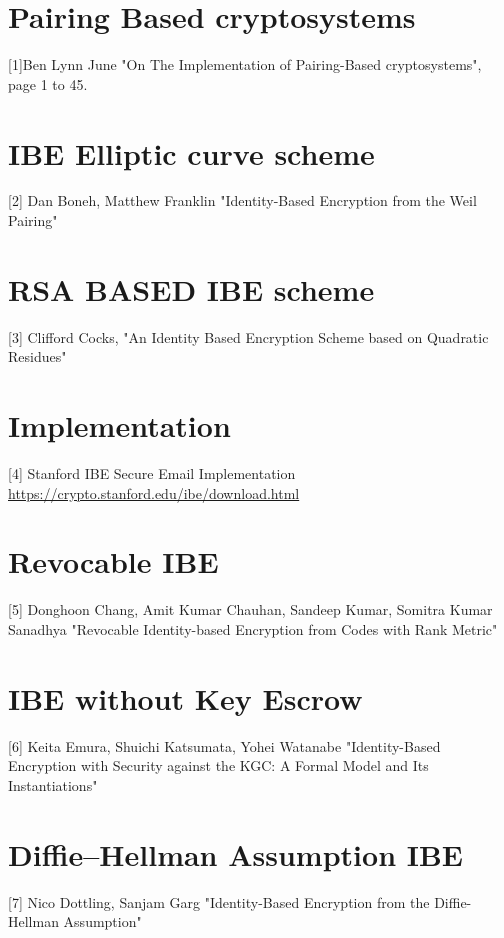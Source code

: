 \documentclass[conference]{IEEEtran}
\begin{document}
\appendix
\section{Pairing Based cryptosystems}
[1]Ben Lynn June "On The Implementation of Pairing-Based cryptosystems", 
page 1 to 45.

\section{IBE Elliptic curve scheme}
[2] Dan Boneh, Matthew Franklin "Identity-Based Encryption from the Weil Pairing"

\section{RSA BASED IBE scheme}
[3] Clifford Cocks, "An Identity Based Encryption Scheme based on Quadratic Residues"

\section{Implementation}
[4] Stanford IBE Secure Email Implementation \url{https://crypto.stanford.edu/ibe/download.html}

\section{Revocable IBE}
[5] Donghoon Chang, Amit Kumar Chauhan, Sandeep Kumar, Somitra Kumar Sanadhya "Revocable Identity-based Encryption from Codes with Rank Metric"

\section{IBE without Key Escrow}
[6] Keita Emura, Shuichi Katsumata, Yohei Watanabe "Identity-Based Encryption with Security against the KGC: A Formal Model and Its Instantiations"

\section{Diffie–Hellman Assumption IBE}
[7] Nico Dottling, Sanjam Garg "Identity-Based Encryption from the Diffie-Hellman Assumption"
\end{document}
